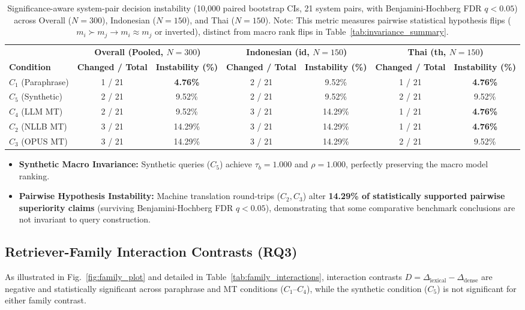 \documentclass[runningheads]{llncs}
\begin{document}
\begin{table}[t]
\centering
\caption{Significance-aware system-pair decision instability (10,000 paired bootstrap CIs, 21 system pairs, with Benjamini-Hochberg FDR $q < 0.05$) across Overall ($N=300$), Indonesian ($N=150$), and Thai ($N=150$). Note: This metric measures pairwise statistical hypothesis flips ($m_i \succ m_j \rightarrow m_i \approx m_j$ or inverted), distinct from macro rank flips in Table~\ref{tab:invariance_summary}.}
\label{tab:significance_summary}
\begin{tabular}{lcccccc}
\toprule
& \multicolumn{2}{c}{\textbf{Overall (Pooled, $N=300$)}} & \multicolumn{2}{c}{\textbf{Indonesian (id, $N=150$)}} & \multicolumn{2}{c}{\textbf{Thai (th, $N=150$)}} \\
\textbf{Condition} & \textbf{Changed / Total} & \textbf{Instability (\%)} & \textbf{Changed / Total} & \textbf{Instability (\%)} & \textbf{Changed / Total} & \textbf{Instability (\%)} \\
\midrule
$C_1$ (Paraphrase) & 1 / 21 & \textbf{4.76\%} & 2 / 21 & 9.52\% & 1 / 21 & \textbf{4.76\%} \\
$C_5$ (Synthetic) & 2 / 21 & 9.52\% & 2 / 21 & 9.52\% & 2 / 21 & 9.52\% \\
$C_4$ (LLM MT) & 2 / 21 & 9.52\% & 3 / 21 & 14.29\% & 1 / 21 & \textbf{4.76\%} \\
$C_2$ (NLLB MT) & 3 / 21 & 14.29\% & 3 / 21 & 14.29\% & 1 / 21 & \textbf{4.76\%} \\
$C_3$ (OPUS MT) & 3 / 21 & 14.29\% & 3 / 21 & 14.29\% & 2 / 21 & 9.52\% \\
\bottomrule
\end{tabular}
\end{table}

\begin{itemize}
    \item \textbf{Synthetic Macro Invariance:} Synthetic queries ($C_5$) achieve $\tau_b = 1.000$ and $\rho = 1.000$, perfectly preserving the macro model ranking.
    \item \textbf{Pairwise Hypothesis Instability:} Machine translation round-trips ($C_2, C_3$) alter \textbf{14.29\% of statistically supported pairwise superiority claims} (surviving Benjamini-Hochberg FDR $q < 0.05$), demonstrating that some comparative benchmark conclusions are not invariant to query construction.
\end{itemize}

\subsection{Retriever-Family Interaction Contrasts (RQ3)}
As illustrated in Fig.~\ref{fig:family_plot} and detailed in Table~\ref{tab:family_interactions}, interaction contrasts $D = \Delta_{\text{lexical}} - \Delta_{\text{dense}}$ are negative and statistically significant across paraphrase and MT conditions ($C_1$--$C_4$), while the synthetic condition ($C_5$) is not significant for either family contrast.
\end{document}

